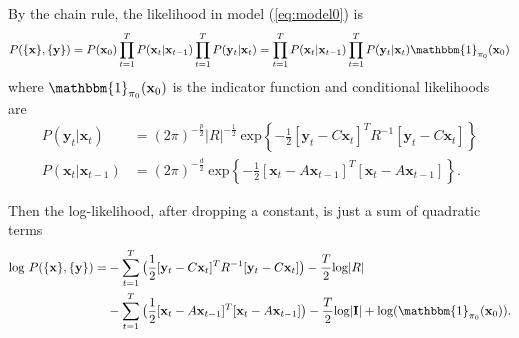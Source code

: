\documentclass[fleqn]{article}
\let\oldref\ref
\renewcommand{\ref}[1]{(\oldref{#1})}
\newcommand{\T}{T}
\begin{document}
By the chain rule, the likelihood in model \ref{eq:model0} is
\begin{equation*}\label{eqn:likelihood}
P(\{\mathbf{x}\},\{\mathbf{y}\})=P(\mathbf{x}_0)\prod\limits_{t=1}^{T}P(\mathbf{x}_t|\mathbf{x}_{t-1})\prod\limits_{t=1}^{T} P(\mathbf{y}_t|\mathbf{x}_t)=\prod\limits_{t=1}^{T}P(\mathbf{x}_t|\mathbf{x}_{t-1})\prod\limits_{t=1}^{T} P(\mathbf{y}_t|\mathbf{x}_t)\mathbbm{1}_{\mathbf{\pi}_0}(\mathbf{x}_0)
\end{equation*}
where $\mathbbm{1}_{\mathbf{\pi}_0}(\mathbf{x}_0)$ is the indicator function and conditional likelihoods are
\begin{equation*}\label{eqn:condlik}
\begin{aligned}
P(\mathbf{y}_t|\mathbf{x}_t)&= (2\pi)^{-\frac{p}{2}}|R|^{-\frac{1}{2}}\  \text{exp}\left\{-\frac{1}{2}[\mathbf{y}_t-C\mathbf{x}_t]^{\T}R^{-1}[\mathbf{y}_t-C\mathbf{x}_t]\right\}\\
P(\mathbf{x}_t|\mathbf{x}_{t-1})
&=(2\pi)^{-\frac{d}{2}}\  \text{exp}\left\{-\frac{1}{2}[\mathbf{x}_t-A\mathbf{x}_{t-1}]^{\T}[\mathbf{x}_t-A\mathbf{x}_{t-1}]\right\}.
\end{aligned}
\end{equation*}

Then the log-likelihood, after dropping a constant, is just a sum of quadratic terms
\begin{equation}\label{eqn:loglik}
\begin{split}
\text{log } P(\{\mathbf{x}\},\{\mathbf{y}\})=&-\sum\limits_{t=1}^{T}\big(\frac{1}{2}[\mathbf{y}_t-C\mathbf{x}_t]^{\T}R^{-1}[\mathbf{y}_t-C\mathbf{x}_t]\big)-\frac{T}{2}\text{log}|R|\\
&-\sum\limits_{t=1}^{T}\big(\frac{1}{2}[\mathbf{x}_t-A\mathbf{x}_{t-1}]^{\T}[\mathbf{x}_t-A\mathbf{x}_{t-1}]\big)-\frac{T}{2}\text{log}|\mathbf{I}|+ \text{log}(\mathbbm{1}_{\mathbf{\pi}_0}(\mathbf{x}_0)).
\end{split}
\end{equation}
\end{document}
